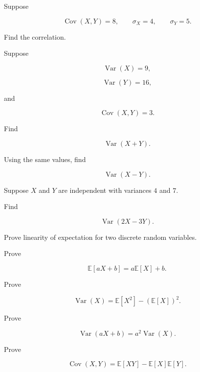 \begin{exercise}[2]
Suppose

\[
\operatorname{Cov}(X,Y)=8,
\qquad
\sigma_X=4,
\qquad
\sigma_Y=5.
\]

Find the correlation.
\end{exercise}

\begin{exercise}[2]
Suppose

\[
\operatorname{Var}(X)=9,
\]

\[
\operatorname{Var}(Y)=16,
\]

and

\[
\operatorname{Cov}(X,Y)=3.
\]

Find

\[
\operatorname{Var}(X+Y).
\]
\end{exercise}

\begin{exercise}[2]
Using the same values, find

\[
\operatorname{Var}(X-Y).
\]
\end{exercise}

\begin{exercise}[2]
Suppose \(X\) and \(Y\) are independent with variances \(4\) and \(7\).

Find

\[
\operatorname{Var}(2X-3Y).
\]
\end{exercise}

\begin{exercise}[3]
Prove linearity of expectation for two discrete random variables.
\end{exercise}

\begin{exercise}[3]
Prove

\[
\mathbb{E}[aX+b]
=
a\mathbb{E}[X]+b.
\]
\end{exercise}

\begin{exercise}[3]
Prove

\[
\operatorname{Var}(X)
=
\mathbb{E}[X^2]
-
(\mathbb{E}[X])^2.
\]
\end{exercise}

\begin{exercise}[3]
Prove

\[
\operatorname{Var}(aX+b)
=
a^2\operatorname{Var}(X).
\]
\end{exercise}

\begin{exercise}[3]
Prove

\[
\operatorname{Cov}(X,Y)
=
\mathbb{E}[XY]
-
\mathbb{E}[X]\mathbb{E}[Y].
\]
\end{exercise}

